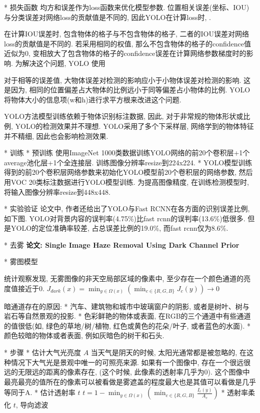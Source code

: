 {				* 损失函数
					均方和误差作为loss函数来优化模型参数. 位置相关误差(坐标、IOU)与分类误差对网络loss的贡献值是不同的, 因此YOLO在计算loss时, .

					在计算IOU误差时, 包含物体的格子与不包含物体的格子, 二者的IOU误差对网络loss的贡献值是不同的. 若采用相同的权值, 那么不包含物体的格子的confidence值近似为0, 变相放大了包含物体的格子的confidence误差在计算网络参数梯度时的影响. 为解决这个问题, YOLO 使用

					对于相等的误差值, 大物体误差对检测的影响应小于小物体误差对检测的影响. 这是因为, 相同的位置偏差占大物体的比例远小于同等偏差占小物体的比例. YOLO将物体大小的信息项(w和h)进行求平方根来改进这个问题. 

					YOLO方法模型训练依赖于物体识别标注数据, 因此, 对于非常规的物体形状或比例, YOLO的检测效果并不理想. YOLO采用了多个下采样层, 网络学到的物体特征并不精细, 因此也会影响检测效果. 

			* 训练
				* 预训练
					使用ImageNet 1000类数据训练YOLO网络的前20个卷积层+1个average池化层+1个全连接层. 训练图像分辨率resize到224x224. 
				* YOLO模型训练
					得到的前20个卷积层网络参数来初始化YOLO模型前20个卷积层的网络参数, 然后用VOC 20类标注数据进行YOLO模型训练. 为提高图像精度, 在训练检测模型时, 将输入图像分辨率resize到448x448. 

			* 实验验证
				论文中, 作者还给出了YOLO与Fast RCNN在各方面的识别误差比例, 如下图. YOLO对背景内容的误判率(4.75\%)比fast rcnn的误判率(13.6\%)低很多. 但是YOLO的定位准确率较差, 占总误差比例的19.0\%, 而fast rcnn仅为8.6\%. 

	* 去雾
		\bf{论文}: Single Image Haze Removal Using Dark Channel Prior

		* 雾图模型

			统计观察发现, 无雾图像的非天空局部区域的像素中, 至少存在一个颜色通道的亮度值接近于0.
			$J_{dark}(x) = \min_{y\in \Omega(x)} (\min_{c\in \{R,G,B\}} J_c(y)) \to 0$

			暗通道存在的原因:
				* 汽车、建筑物和城市中玻璃窗户的阴影, 或者是树叶、树与岩石等自然景观的投影.
				* 色彩鲜艳的物体或表面, 在RGB的三个通道中有些通道的值很低(如, 绿色的草地/树/植物, 红色或黄色的花朵/叶子, 或者蓝色的水面).
				* 颜色较暗的物体或者表面, 例如灰暗色的树干和石头. 

		* 步骤
			* 估计大气光亮度 $A$
				当天气是阴天的时候, 太阳光通常都是被忽略的, 在这种情况下大气光是景观中唯一的可照亮来源. 如果有一个图像中, 存在一个很远很远的无限远的距离的像素存在, (这个时候, 此像素的透射率几乎为0). 这个图像中最亮最亮的值所在的像素可以被看做是雾遮盖的程度最大也是其值可以看做是几乎等同于A.
			* 估计透射率 $t$
				$t = 1 - \min_{y\in \Omega(x)} ( \min_{c\in \{R,G,B\}} \frac{I_c(y)}{A_c} )$
			* 透射率柔化 $t$, 导向滤波
			
}
